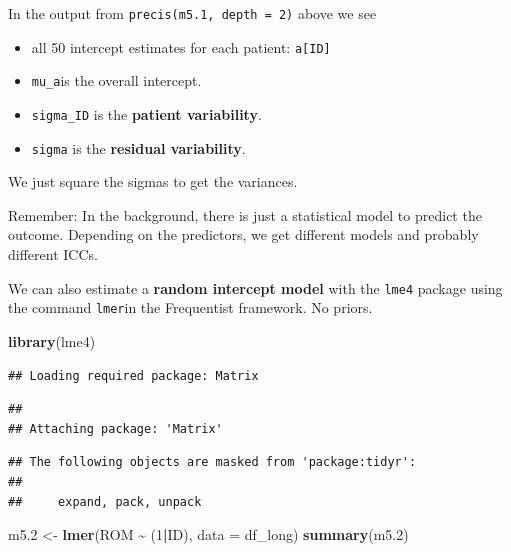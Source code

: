 \documentclass[
]{book}
\newenvironment{Shaded}{\begin{snugshade}}{\end{snugshade}}
\newcommand{\AttributeTok}[1]{\textcolor[rgb]{0.13,0.29,0.53}{#1}}
\newcommand{\DecValTok}[1]{\textcolor[rgb]{0.00,0.00,0.81}{#1}}
\newcommand{\FloatTok}[1]{\textcolor[rgb]{0.00,0.00,0.81}{#1}}
\newcommand{\FunctionTok}[1]{\textcolor[rgb]{0.13,0.29,0.53}{\textbf{#1}}}
\newcommand{\NormalTok}[1]{#1}
\newcommand{\OtherTok}[1]{\textcolor[rgb]{0.56,0.35,0.01}{#1}}
\newcommand{\SpecialCharTok}[1]{\textcolor[rgb]{0.81,0.36,0.00}{\textbf{#1}}}
\providecommand{\tightlist}{%
  \setlength{\itemsep}{0pt}\setlength{\parskip}{0pt}}
\begin{document}
In the output from \texttt{precis(m5.1,\ depth\ =\ 2)} above we see

\begin{itemize}
\tightlist
\item
  all 50 intercept estimates for each patient: \texttt{a{[}ID{]}}
\item
  \texttt{mu\_a}is the overall intercept.
\item
  \texttt{sigma\_ID} is the \textbf{patient variability}.
\item
  \texttt{sigma} is the \textbf{residual variability}.
\end{itemize}

We just square the sigmas to get the variances.

Remember: In the background, there is just a statistical model to predict
the outcome. Depending on the predictors, we get different models and
probably different ICCs.

We can also estimate a \textbf{random intercept model} with the \texttt{lme4} package using
the command \texttt{lmer}in the Frequentist framework. No priors.

\begin{Shaded}
\begin{Highlighting}[]
\FunctionTok{library}\NormalTok{(lme4)}
\end{Highlighting}
\end{Shaded}

\begin{verbatim}
## Loading required package: Matrix
\end{verbatim}

\begin{verbatim}
## 
## Attaching package: 'Matrix'
\end{verbatim}

\begin{verbatim}
## The following objects are masked from 'package:tidyr':
## 
##     expand, pack, unpack
\end{verbatim}

\begin{Shaded}
\begin{Highlighting}[]
\NormalTok{m5}\FloatTok{.2} \OtherTok{\textless{}{-}} \FunctionTok{lmer}\NormalTok{(ROM }\SpecialCharTok{\textasciitilde{}}\NormalTok{ (}\DecValTok{1}\SpecialCharTok{|}\NormalTok{ID), }\AttributeTok{data =}\NormalTok{ df\_long)}
\FunctionTok{summary}\NormalTok{(m5}\FloatTok{.2}\NormalTok{)}
\end{Highlighting}
\end{Shaded}
\end{document}
